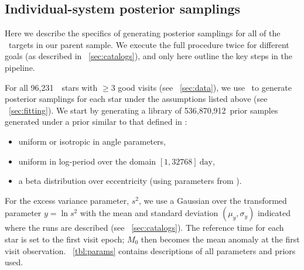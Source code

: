 \documentclass[modern, letterpaper]{aastex62}
\newcommand{\apogee}{\project{\acronym{APOGEE}}}
\newcommand{\thejoker}{\project{The~Joker}}
\newcommand{\nprior}{536,870,912}
\newcommand{\nstars}{96,231}
\begin{document}
\subsection{Individual-system posterior samplings}
\label{sec:samplings}

Here we describe the specifics of generating posterior samplings for all of the
\apogee\ targets in our parent sample.
We execute the full procedure twice for different goals (as described in
\sectionname~\ref{sec:catalogs}), and only here outline the key steps in the
pipeline.

For all \nstars\ \apogee\ stars with $\geq 3$ good visits (see
\sectionname~\ref{sec:data}), we use \thejoker\ to generate posterior samplings
for each star under the assumptions listed above (see
\sectionname~\ref{sec:fitting}).
We start by generating a library of \nprior\ prior samples generated under a
prior similar to that defined in \citet{Price-Whelan:2017}:
\begin{itemize}
    \item uniform or isotropic in angle parameters,
    \item uniform in log-period over the domain $[1,32768]~\textrm{day}$,
    \item a beta distribution over eccentricity (using parameters from
    \citealt{Kipping:2013}).
\end{itemize}
For the excess variance parameter, $s^2$, we use a Gaussian over the transformed
parameter $y = \ln s^2$ with the mean and standard deviation $(\mu_y, \sigma_y)$
indicated where the runs are described (see \sectionname~\ref{sec:catalogs}).
The reference time for each star is set to the first visit epoch; $M_0$ then
becomes the mean anomaly at the first visit observation.
\tablename~\ref{tbl:params} contains descriptions of all parameters and priors
used.
\end{document}
